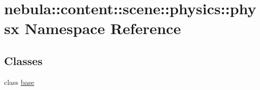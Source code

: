 \hypertarget{namespacenebula_1_1content_1_1scene_1_1physics_1_1physx}{
\section{nebula::content::scene::physics::physx Namespace Reference}
\label{namespacenebula_1_1content_1_1scene_1_1physics_1_1physx}
}
\subsection*{Classes}
\begin{DoxyCompactItemize}
\item 
class \hyperlink{classnebula_1_1content_1_1scene_1_1physics_1_1physx_1_1base}{base}
\end{DoxyCompactItemize}
